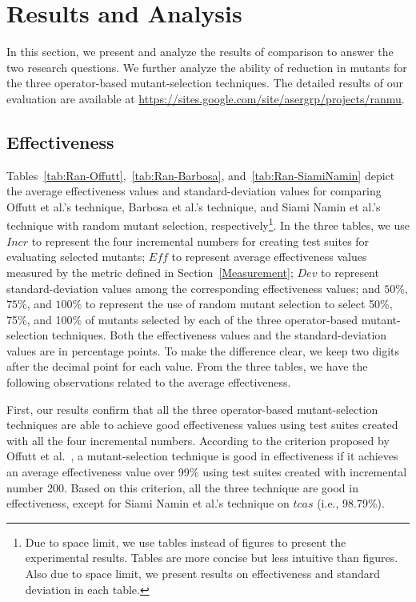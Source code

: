 \vspace{-2ex}
\section{Results and Analysis}
\label{Results}

In this section, we present and analyze the results of comparison
to answer the two research questions. We further analyze the
ability of reduction in mutants for the three operator-based
mutant-selection techniques. The detailed results
of our evaluation are available at \url{https://sites.google.com/site/asergrp/projects/ranmu}.


\vspace{-1ex}
\subsection{Effectiveness}
\label{OffuttEff}

Tables~\ref{tab:Ran-Offutt},~\ref{tab:Ran-Barbosa},
and~\ref{tab:Ran-SiamiNamin} depict the average effectiveness values
and standard-deviation values for comparing Offutt et al.'s
technique, Barbosa et al.'s technique, and Siami Namin et al.'s
technique with random mutant selection, respectively\footnote{Due to
space limit, we use tables instead of figures to present the
experimental results. Tables are more concise but less intuitive
than figures. Also due to space limit, we present results on
effectiveness and standard deviation in each table.}. In the three
tables, we use $Incr$ to represent the four incremental numbers for
creating test suites for evaluating selected mutants; $Eff$ to
represent average effectiveness values measured by the metric
defined in Section~\ref{Measurement}; $Dev$ to represent
standard-deviation values among the corresponding effectiveness
values; and $50\%$, $75\%$, and $100\%$ to represent the use of
random mutant selection to select 50\%, 75\%, and 100\% of mutants
selected by each of the three operator-based mutant-selection
techniques. Both the effectiveness values and the standard-deviation
values are in percentage points. To make the difference clear, we
keep two digits after the decimal point for each value. From the
three tables, we have the following observations related to the
average effectiveness.

First, our results confirm that all the three operator-based
mutant-selection techniques are able to achieve good effectiveness
values using test suites created with all the four incremental
numbers. According to the criterion proposed by Offutt et
al.~\cite{Offutt:96}, a mutant-selection technique is good in
effectiveness if it achieves an average effectiveness value over
99\% using test suites created with incremental number 200. Based
on this criterion, all the three technique are good in
effectiveness, except for Siami Namin et al.'s technique on $tcas$
(i.e., 98.79\%).

